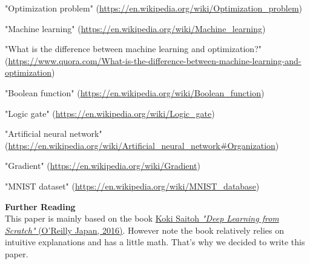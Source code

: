 \documentclass{article}
\theoremstyle{definition}
\begin{document}

\newpage



\newpage

\begin{thebibliography}{100}

"Optimization problem" (\url{https://en.wikipedia.org/wiki/Optimization_problem})

"Machine learning" (\url{https://en.wikipedia.org/wiki/Machine_learning})

"What is the difference between machine learning and optimization?" (\url{https://www.quora.com/What-is-the-difference-between-machine-learning-and-optimization})

"Boolean function" (\url{https://en.wikipedia.org/wiki/Boolean_function})

"Logic gate" (\url{https://en.wikipedia.org/wiki/Logic_gate})

"Artificial neural network" (\url{https://en.wikipedia.org/wiki/Artificial_neural_network#Organization})

"Gradient" (\url{https://en.wikipedia.org/wiki/Gradient})

"MNIST dataset" (\url{https://en.wikipedia.org/wiki/MNIST_database})

\end{thebibliography}

\enter
{\bf Further Reading}\\
This paper is mainly based on the book \href{https://www.oreilly.co.jp/books/9784873117584/}{Koki Saitoh {\it "Deep Learning from Scratch"} (O'Reilly Japan, 2016)}. However note the book relatively relies on intuitive explanations and has a little math. That's why we decided to write this paper.
\end{document}
